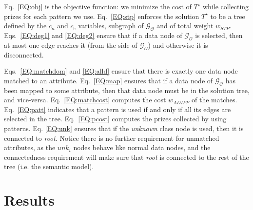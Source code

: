 \documentclass[letterpaper]{article} %
\newcommand{\ignore}[1]{}
\newcommand{\forijcai}[1]{}
\begin{document}
Eq.~\ref{EQ:obj} is the objective function: we minimize the cost 
of $T^\star$ while collecting prizes for each pattern we use. 
Eq.~\ref{EQ:stp} enforces the solution 
$T^\star$ to be a tree defined by the $c_n$ and $c_e$ variables,
subgraph of $\mathcal{G_O}$%
and of total weight $w_{STP}$. 
Eqs.~\ref{EQ:deg1} and \ref{EQ:deg2} ensure 
that if a data node of $\mathcal{G_O}$ is selected, then at most one edge 
reaches it (from the side of $\mathcal{G_O}$) and otherwise it is 
disconnected. 
\ignore{Eq. \ref{EQ:matchdom} ensures that the domain of each 
variable in 
the array $match$ corresponds to a subset of data nodes of $\mathcal{G_O}$ 
for which there is an edge connecting to the attribute at hand. 
Eq.~\ref{EQ:alld} ensure that each attribute is mapped to exactly one data node of 
$\mathcal{G_O}$.}
Eqs.~\ref{EQ:matchdom} and \ref{EQ:alld} ensure that 
there is exactly one data node matched to an attribute. 
Eq.~\ref{EQ:map} ensures that 
if a data node of $\mathcal{G_O}$ has been mapped to some attribute, then 
that data node must be in the solution tree, and vice-versa. 
Eq.~\ref{EQ:matchcost} computes the cost $w_{ADIFF}$ of the matches.
Eq.~\ref{EQ:patt} indicates that a pattern is used if and only if all its edges are selected in the tree. 
Eq.~\ref{EQ:pcost} computes the prizes collected by using patterns.
Eq. \ref{EQ:unk} ensures that if the \emph{unknown} class node is used, then it 
is connected to \emph{root}.
Notice there is no further requirement for unmatched attributes, as the 
$unk_i$ nodes behave like normal data nodes, and the connectedness 
requirement will make sure that \emph{root} is connected to the rest of the 
tree (i.e. the semantic model).

\forijcai{
Note how this CP model is easy to adapt to more classic settings where no 
patterns are used (by dropping Eqs. \ref{EQ:patt} and \ref{EQ:pcost}), or 
without \emph{unknown} nodes (by dropping Eq. \ref{EQ:unk}).

We choose a search strategy that will first try to match attributes using the cheapest edges in $\mathcal{M}_\mathcal{O}^{s^\star}$. Then, it will try to use the cheapest unfixed edge $e\in\mathcal{E_O}$ that fills a pattern $p$ (i.e. $\forall e_p\in p, e_p \neq e, c_{e_p}$) such that $w_\mathcal{P}(p) > w_\mathcal{O}(e)$ or simply the cheapest edge if none fill a pattern.
}

\section{Results \label{SEC:Res}}
\end{document}
